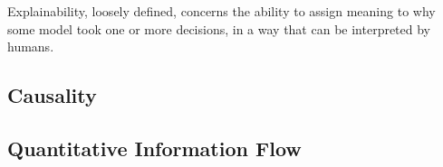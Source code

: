 


Explainability, loosely defined, concerns the ability to assign meaning to why some model took one or more decisions, in a way that can be interpreted by humans. 

\subsection{Causality}



\subsection{Quantitative Information Flow}



